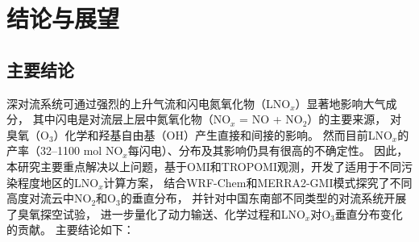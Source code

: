 
\chapter{结论与展望}

\section{主要结论}

深对流系统可通过强烈的上升气流和闪电氮氧化物（LNO$_x$）显著地影响大气成分，
其中闪电是对流层上层中氮氧化物（NO$_x$ = NO + NO$_2$）的主要来源，
对臭氧（O$_3$）化学和羟基自由基（OH）产生直接和间接的影响。
然而目前LNO$_x$的产率（32--1100 mol NO$_x$每闪电）、分布及其影响仍具有很高的不确定性。
因此，本研究主要重点解决以上问题，基于OMI和TROPOMI观测，开发了适用于不同污染程度地区的LNO$_x$计算方案，
结合WRF-Chem和MERRA2-GMI模式探究了不同高度对流云中NO$_2$和O$_3$的垂直分布，
并针对中国东南部不同类型的对流系统开展了臭氧探空试验，
进一步量化了动力输送、化学过程和LNO$_x$对O$_3$垂直分布变化的贡献。
主要结论如下：

